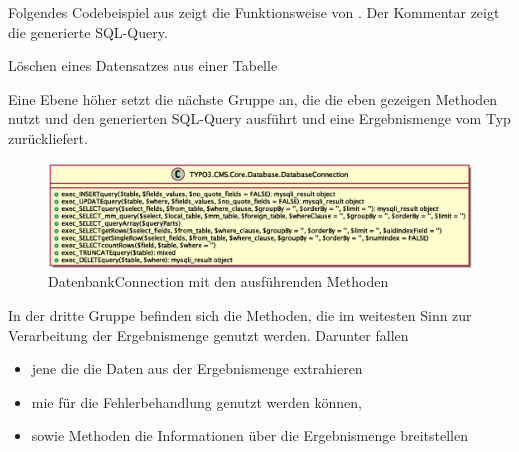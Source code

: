 Folgendes Codebeispiel aus  zeigt die Funktionsweise von . Der Kommentar zeigt die generierte SQL-Query.

\begin{listing}
	\caption{Löschen eines Datensatzes aus einer Tabelle}
	\label{lst:databaseOldDeleteExample}
\end{listing}

Eine Ebene höher setzt die nächste Gruppe an, die die eben gezeigen Methoden nutzt und den generierten SQL-Query ausführt und eine Ergebnismenge vom Typ  zurückliefert.

\begin{figure}[H]
\centering
\includegraphics[scale=0.5]{gfx/uml/DatabaseConnectionExecuteMethods.eps}
\caption{DatenbankConnection mit den ausführenden Methoden}
\label{fig:databaseConnectionWithSQLExecutionMethods}
\end{figure}

In der dritte Gruppe befinden sich die Methoden, die im weitesten Sinn zur Verarbeitung der Ergebnismenge genutzt werden. Darunter fallen

\begin{itemize}
	\item jene die die Daten aus der Ergebnismenge extrahieren
	\item mie für die Fehlerbehandlung genutzt werden können,
	\item sowie Methoden die Informationen über die Ergebnismenge breitstellen
\end{itemize}

